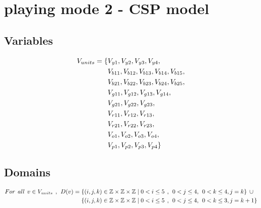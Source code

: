 \section{playing mode 2 - CSP model}
\label{sec:CSP model2}
\subsection{Variables}
\begin{align*}
V_{units}=\{&V_{y1},V_{y2},V_{y3},V_{y4},\\&V_{b11},V_{b12},V_{b13},V_{b14},
V_{b15},\\&V_{b21},V_{b22},V_{b23},V_{b24},V_{b25},\\&V_{g11},V_{g12},V_{g13},V_{g14},\\&V_{g21},V_{g22},V_{g23},\\&V_{r11},
V_{r12},V_{r13},\\&V_{r21},V_{r22},V_{r23},\\&V_{o1},V_{o2},V_{o3},V_{o4},\\&V_{p1},V_{p2},V_{p3},V_{p4}\}
\end{align*}
\subsection{Domains}
\begin{align*}
For \hspace{1ex} all \hspace{1ex} v \in V_{units} \hspace{1ex},\hspace{1ex} D(v)=\{&(i,j,k) \in \mathbb{Z} \times \mathbb{Z}	\times \mathbb{Z} \mid  0<i \leq 5 \hspace{1ex} , \hspace{1ex} 0<j \leq 4,\hspace{1ex} 0<k \leq 4,j=k\} \hspace{1ex}\cup\\
\{&(i,j,k) \in \mathbb{Z} \times \mathbb{Z}	\times \mathbb{Z} \mid  0<i \leq 5 \hspace{1ex} , \hspace{1ex} 0<j \leq 4,\hspace{1ex} 0<k \leq 3,j=k+1\}
\end{align*}